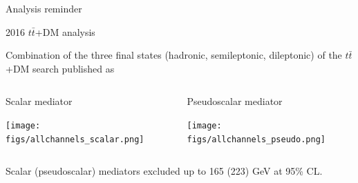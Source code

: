 \documentclass[9pt]{beamer}
\begin{document}
\begin{frame}{Analysis reminder}
\end{frame}

\begin{frame}{2016 $t \bar t$+DM analysis}
\justifying

Combination of the three final states (hadronic, semileptonic, dileptonic) of the $t \bar t$+DM search published as \href{http://cms-results.web.cern.ch/cms-results/public-results/preliminary-results/EXO-16-049/}{} \vfill

\begin{center}
\begin{columns}
	\begin{column}{0.49\textwidth}
		\begin{center}
			\begin{block}{ \centering Scalar mediator}\end{block}	
			\texttt{[image: figs/allchannels\_scalar.png]}
    		 \end{center}
	\end{column} \hfill
	\begin{column}{0.49\textwidth}
		\begin{center}
		\vspace{-5pt}
			\begin{block}{\centering Pseudoscalar mediator}\end{block}				
			\texttt{[image: figs/allchannels\_pseudo.png]}
    		 \end{center}
	\end{column} \hfill
\end{columns} \vfill

\end{center} \vfill 
Scalar (pseudoscalar) mediators \alert{excluded up to 165 (223) GeV} at 95\% CL. \vfill 

\end{frame}
\end{document}
